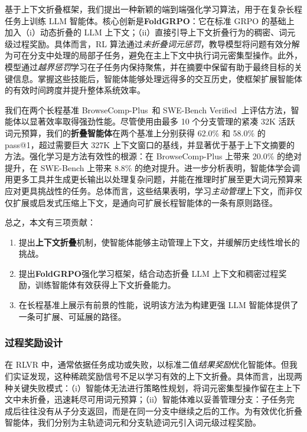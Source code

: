 基于上下文折叠框架，我们提出一种新颖的端到端强化学习算法，用于在复杂长程任务上训练 LLM 智能体。核心创新是\textbf{FoldGRPO}：它在标准 GRPO 的基础上加入（i）动态折叠的 LLM 上下文；（ii）直接引导上下文折叠行为的稠密、词元级过程奖励。具体而言，RL 算法通过\textit{未折叠词元惩罚}，教导模型将问题有效分解为可在分支中处理的局部子任务，避免在主上下文中执行词元密集型操作。此外，模型通过\textit{越界惩罚}学习在子任务内保持聚焦，并在摘要中保留有助于最终目标的关键信息。掌握这些技能后，智能体能够处理远得多的交互历史，使框架扩展智能体的有效时间跨度并提升整体系统效率。

我们在两个长程基准 BrowseComp-Plus~\citep{Chen2025BrowseCompPlusAM}和 SWE-Bench Verified~\citep{Jimenez2023SWEbenchCL}上评估方法，智能体以显著效率取得强劲性能。尽管使用由最多 10 个分支管理的紧凑 32K 活跃词元预算，我们的\textbf{折叠智能体}在两个基准上分别获得 62.0\% 和 58.0\% 的 pass@1，超过需要巨大 327K 上下文窗口的基线，并显著优于基于上下文摘要的方法。强化学习是方法有效性的根源：在 BrowseComp-Plus 上带来 20.0\% 的绝对提升，在 SWE-Bench 上带来 8.8\% 的绝对提升。进一步分析表明，智能体学会调用更多工具并生成更长输出以处理复杂问题，并能在推理时扩展至更大词元预算来应对更具挑战性的任务。总体而言，这些结果表明，学习\textit{主动管理}上下文，而非仅仅扩展或启发式压缩上下文，是通向可扩展长程智能体的一条有原则路径。

总之，本文有三项贡献：
\begin{enumerate}[label=(\roman*),leftmargin=20pt]
\item 提出\textbf{上下文折叠}机制，使智能体能够主动管理上下文，并缓解历史线性增长的挑战。
\item 提出\textbf{FoldGRPO}强化学习框架，结合动态折叠 LLM 上下文和稠密过程奖励，训练智能体有效获得上下文折叠能力。
\item 在长程基准上展示有前景的性能，说明该方法为构建更强 LLM 智能体提供了一条可扩展、可延展的路径。
\end{enumerate}

\subsubsection{过程奖励设计}\label{subsubsec: prm}
在 RLVR 中，通常依据任务成功或失败，以标准二值\textit{结果奖励}优化智能体。但我们实证发现，这种稀疏奖励信号不足以学习有效的上下文折叠。具体而言，出现两种关键失败模式：（i）智能体无法进行策略性规划，将词元密集型操作留在主上下文中未折叠，迅速耗尽可用词元预算；（ii）智能体难以妥善管理分支：子任务完成后往往没有从子分支返回，而是在同一分支中继续之后的工作。为有效优化折叠智能体，我们分别为主轨迹词元和分支轨迹词元引入词元级过程奖励。

